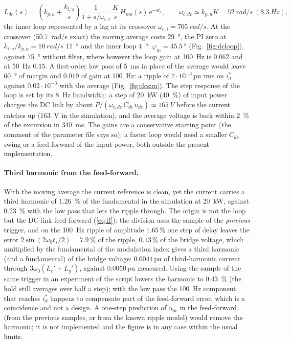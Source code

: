 \documentclass[10pt,a4paper]{scrartcl}
\newcommand{\ts}{t_s}
\newcommand{\wo}{\omega_0}
\newcommand{\kpu}{k_{p,u}}
\newcommand{\kiu}{k_{i,u}}
\newcommand{\ee}{\mathrm{e}}
\newcommand{\pu}{\,\mathrm{pu}}
\begin{document}
\begin{onehalfspace}
\begin{equation}
L_{dc}(s) = \left(\kpu + \frac{\kiu}{s}\right)\frac{1}{1 + s/\omega_{c,i}}\,\frac{K}{s}\,H_{ma}(s)\,\ee^{-s\ts}, \qquad \omega_{c,dc} \simeq \kpu K = \SI{52}{rad/s} \ (\SI{8.3}{Hz}),
\label{eq:dc_loop}
\end{equation}
the inner loop represented by a lag at its crossover $\omega_{c,i} = \SI{705}{rad/s}$. At the crossover (\SI{50.7}{rad/s} exact) the moving average costs \SI{29}{\degree}, the PI zero at $\kiu/\kpu = \SI{10}{rad/s}$ \SI{11}{\degree} and the inner loop \SI{4}{\degree}: $\varphi_m = \SI{45.5}{\degree}$ (Fig.~\ref{fig:dcloop}), against \SI{75}{\degree} without filter, where however the loop gain at \SI{100}{Hz} is $0.062$ and at \SI{50}{Hz} $0.15$. A first-order low pass of \SI{5}{ms} in place of the average would leave \SI{60}{\degree} of margin and $0.019$ of gain at \SI{100}{Hz}: a ripple of $7\cdot10^{-3}\pu$ rms on $i_d^*$ against $0.02\cdot10^{-3}$ with the average (Fig.~\ref{fig:dcsim}). The step response of the loop is set by its \SI{8}{Hz} bandwidth: a step of \SI{20}{kW} (\SI{40}{\percent}) of input power charges the DC link by about $P/(\omega_{c,dc}\,C_{dc}\,u_{dc}) \simeq \SI{165}{V}$ before the current catches up (\SI{163}{V} in the simulation), and the average voltage is back within \SI{2}{\percent} of the excursion in \SI{340}{ms}. The gains are a conservative starting point (the comment of the parameter file says so): a faster loop would need a smaller $C_{dc}$ swing or a feed-forward of the input power, both outside the present implementation.

\paragraph{Third harmonic from the feed-forward.} With the moving average the current reference is clean, yet the current carries a third harmonic of \SI{1.26}{\percent} of the fundamental in the simulation at \SI{20}{kW}, against \SI{0.23}{\percent} with the low pass that lets the ripple through. The origin is not the loop but the DC-link feed-forward (\ref{eq:ff}): the division uses the sample of the \emph{previous} trigger, and on the \SI{100}{Hz} ripple of amplitude $1.65$\,\% one step of delay leaves the error $2\sin(2\wo\ts/2) = \SI{7.9}{\percent}$ of the ripple, $0.13$\,\% of the bridge voltage, which multiplied by the fundamental of the modulation index gives a third harmonic (and a fundamental) of the bridge voltage: $0.0044\pu$ of third-harmonic current through $3\wo(L_c' + L_g')$, against $0.0050\pu$ measured. Using the sample of the same trigger in an experiment of the script lowers the harmonic to \SI{0.43}{\percent} (the hold still averages over half a step); with the low pass the \SI{100}{Hz} component that reaches $i_d^*$ happens to compensate part of the feed-forward error, which is a coincidence and not a design. A one-step prediction of $u_{dc}$ in the feed-forward (from the previous samples, or from the known ripple model) would remove the harmonic; it is not implemented and the figure is in any case within the usual limits.


\end{onehalfspace}
\end{document}
